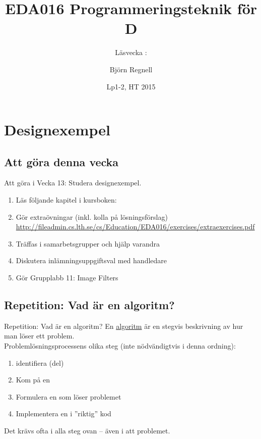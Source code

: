 \documentclass{lecturenotes}
\title[Föreläsningsanteckningar EDA016, 2015]{EDA016 Programmeringsteknik för D}
\subtitle{Läsvecka \vecka: \tema}
\author{Björn Regnell}
\institute{Datavetenskap, LTH}
\date{Lp1-2, HT 2015}
\renewcommand{\vecka}{13}
\newcommand{\tema}{Designexempel}
\begin{document}
\frame{\titlepage}
\setnextsection{\vecka}
\section[Vecka \vecka: \tema]{\tema}
\frame{\tableofcontents}

\subsection{Att göra denna vecka}
\begin{Slide}{Att göra i Vecka \vecka: Studera designexempel.}

\begin{enumerate}
\item Läs följande kapitel i kursboken:  \\  
  
\item Gör extraövningar (inkl. kolla på lösningsförslag) \\ {\scriptsize \url{http://fileadmin.cs.lth.se/cs/Education/EDA016/exercises/extraexercises.pdf}}
\item Träffas i samarbetsgrupper och hjälp varandra 
\item Diskutera inlämningsuppgiftsval med handledare 
\item Gör Grupplabb 11: Image Filters
\end{enumerate}
\end{Slide}

\subsection{Repetition: Vad är en algoritm?}
\begin{Slide}{Repetition: Vad är en algoritm? }\footnotesize
En \href{https://sv.wikipedia.org/wiki/Algoritm}{algoritm} är en stegvis beskrivning av hur man löser ett problem. \\ 
\vspace{1em}
Problemlösningsprocessens olika steg (inte nödvändigtvis i denna ordning): 
\begin{enumerate}
\item identifiera (del)
\item Kom på en 
\item Formulera en  som löser problemet
\item Implementera en  i ''riktig'' kod
\end{enumerate}
Det krävs ofta  i alla steg ovan  -- även i att  problemet.
\end{Slide}
\end{document}

